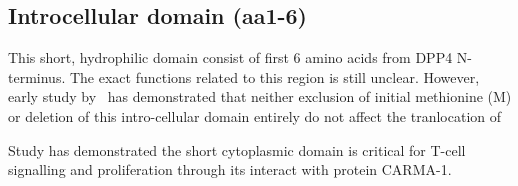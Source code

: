 \subsection{Introcellular domain (aa1-6)}

This short, hydrophilic domain consist of first 6 amino acids from DPP4 N-terminus. The exact functions related to this region is still unclear. However, early study by~\citet{Hong1990} has demonstrated that neither exclusion of initial methionine (M) or deletion of this intro-cellular domain entirely do not affect the tranlocation of 

Study has demonstrated the short cytoplasmic domain is critical for T-cell signalling and proliferation through its interact with protein CARMA-1. \cite{Ohnuma_2007}